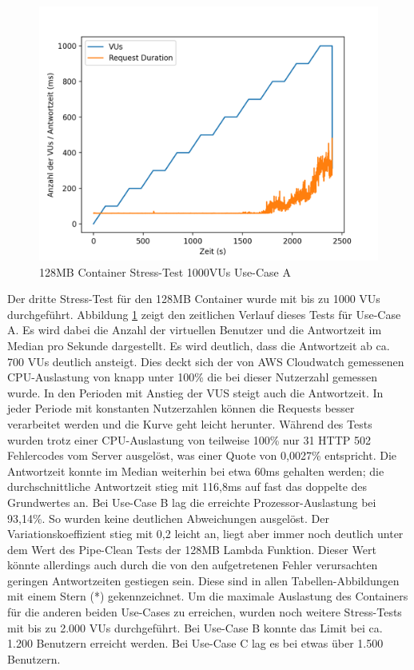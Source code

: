 \begin{figure}[H]
    \includegraphics[width=\textwidth]{img/fargate128-stress1000.png}
    \caption[Container Stress-Test 1000VUs]{128MB Container Stress-Test 1000VUs Use-Case A}
    \label{fig:fargate128-stress1000}
\end{figure}

Der dritte Stress-Test für den 128MB Container wurde mit bis zu 1000 VUs durchgeführt. Abbildung \ref{fig:fargate128-stress1000} zeigt den zeitlichen Verlauf dieses Tests für Use-Case A. Es wird dabei die Anzahl der virtuellen Benutzer und die Antwortzeit im Median pro Sekunde dargestellt. Es wird deutlich, dass die Antwortzeit ab ca. 700 VUs deutlich ansteigt. Dies deckt sich der von AWS Cloudwatch gemessenen CPU-Auslastung von knapp unter 100\% die bei dieser Nutzerzahl gemessen wurde. In den Perioden mit Anstieg der VUS steigt auch die Antwortzeit. In jeder Periode mit konstanten Nutzerzahlen können die Requests besser verarbeitet werden und die Kurve geht leicht herunter. Während des Tests wurden trotz einer CPU-Auslastung von teilweise 100\% nur 31 HTTP 502 Fehlercodes vom Server ausgelöst, was einer Quote von 0,0027\% entspricht. Die Antwortzeit konnte im Median weiterhin bei etwa 60ms gehalten werden; die durchschnittliche Antwortzeit stieg mit 116,8ms auf fast das doppelte des Grundwertes an.  
Bei Use-Case B lag die erreichte Prozessor-Auslastung bei 93,14\%. So wurden keine deutlichen Abweichungen ausgelöst. Der Variationskoeffizient stieg mit 0,2 leicht an, liegt aber immer noch deutlich unter dem Wert des Pipe-Clean Tests der 128MB Lambda Funktion. Dieser Wert könnte allerdings auch durch die von den aufgetretenen Fehler verursachten geringen Antwortzeiten gestiegen sein. Diese sind in allen Tabellen-Abbildungen mit einem Stern (*) gekennzeichnet.
Um die maximale Auslastung des Containers für die anderen beiden Use-Cases zu erreichen, wurden noch weitere Stress-Tests mit bis zu 2.000 VUs durchgeführt. Bei Use-Case B konnte das Limit bei ca. 1.200 Benutzern erreicht werden. Bei Use-Case C lag es bei etwas über 1.500 Benutzern.

